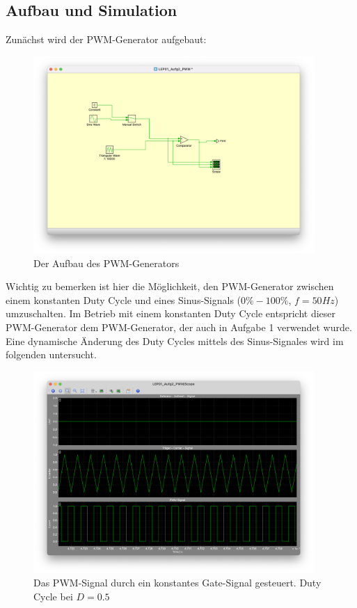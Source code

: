 \documentclass{report}
\begin{document}
\subsection{Aufbau und Simulation}

Zunächst wird der PWM-Generator aufgebaut: 

\begin{figure}
  \begin{center}
  \includegraphics[width=0.95\textwidth]{assets/img/aufg2_aufbau_pwm.png}
  \end{center}
  \caption{Der Aufbau des PWM-Generators}
  \label{fig:aufg2_aufbau_pwm}
\end{figure}


Wichtig zu bemerken ist hier die Möglichkeit, den PWM-Generator zwischen einem konstanten Duty Cycle und eines Sinus-Signals ($0\% - 100\%$, $f=50Hz$) umzuschalten. Im Betrieb mit einem konstanten Duty Cycle entspricht dieser PWM-Generator dem PWM-Generator, der auch in Aufgabe 1 verwendet wurde. Eine dynamische Änderung des Duty Cycles mittels des Sinus-Signales wird im folgenden untersucht.

\begin{figure}[h]
  \begin{center}
    \includegraphics[width=0.95\textwidth]{assets/img/aufg2_pwm_c.png}
  \end{center}
  \caption{Das PWM-Signal durch ein konstantes Gate-Signal gesteuert. Duty Cycle bei $D=0.5$}
  \label{fig:aufg2_pwm_c}
\end{figure}
\end{document}
